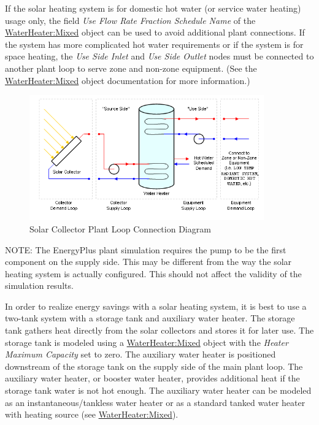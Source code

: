 If the solar heating system is for domestic hot water (or service water heating) usage only, the field \emph{Use Flow Rate Fraction Schedule Name} of the \hyperref[waterheatermixed]{WaterHeater:Mixed} object can be used to avoid additional plant connections. If the system has more complicated hot water requirements or if the system is for space heating, the \emph{Use Side Inlet} and \emph{Use Side Outlet} nodes must be connected to another plant loop to serve zone and non-zone equipment. (See the \hyperref[waterheatermixed]{WaterHeater:Mixed} object documentation for more information.)

\begin{figure}[hbtp] %
\centering
\includegraphics[width=0.9\textwidth, height=0.9\textheight, keepaspectratio=true]{media/image339.png}
\caption{Solar Collector Plant Loop Connection Diagram \protect \label{fig:solar-collector-plant-loop-connection-diagram}}
\end{figure}

NOTE: The EnergyPlus plant simulation requires the pump to be the first component on the supply side. This may be different from the way the solar heating system is actually configured. This should not affect the validity of the simulation results.

In order to realize energy savings with a solar heating system, it is best to use a two-tank system with a storage tank and auxiliary water heater. The storage tank gathers heat directly from the solar collectors and stores it for later use. The storage tank is modeled using a \hyperref[waterheatermixed]{WaterHeater:Mixed} object with the \emph{Heater Maximum Capacity} set to zero. The auxiliary water heater is positioned downstream of the storage tank on the supply side of the main plant loop. The auxiliary water heater, or booster water heater, provides additional heat if the storage tank water is not hot enough. The auxiliary water heater can be modeled as an instantaneous/tankless water heater or as a standard tanked water heater with heating source (see \hyperref[waterheatermixed]{WaterHeater:Mixed}).

